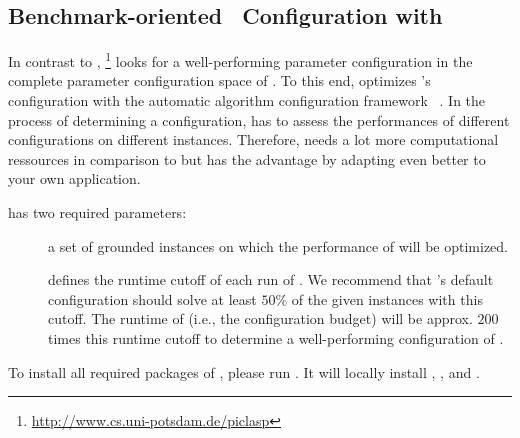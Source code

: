 \subsection{Benchmark-oriented \clasp\ Configuration with \piclasp}
\label{sec:piclasp}

In contrast to \claspfolio{}, 
\piclasp{}\footnote{\url{http://www.cs.uni-potsdam.de/piclasp}} looks for a well-performing parameter configuration 
in the complete parameter configuration space of \clasp{}.
To this end, \piclasp{} optimizes \clasp{}'s configuration with the automatic algorithm configuration framework \smac{}~\cite{huhole11b}.
In the process of determining a configuration,
\piclasp{} has to assess the performances of different \clasp{} configurations on different instances. 
Therefore, \piclasp{} needs a lot more computational ressources in comparison to \claspfolio{}
but has the advantage by adapting \clasp{} even better to your own application.
 
\piclasp{} has two required parameters:
%
\begin{description}
  \item[] a set of grounded instances on which the performance of \clasp{} will be optimized.
  \item[] defines the runtime cutoff of each run of \clasp. 
  		We recommend that \clasp{}'s default configuration should solve at least $50\%$ of the given instances with this cutoff.
  		The runtime of \piclasp{} (i.e., the configuration budget) will be approx. $200$ times this runtime cutoff 
  		to determine a well-performing configuration of \clasp{}.
\end{description} 

To install all required packages of \piclasp{}, please run . 
It will locally install \clasp{}, \smac{},  and \claspre{}.

